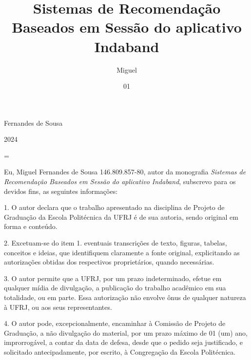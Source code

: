 \documentclass[tcc,numbers]{coppe}
\begin{document}
  \title{Sistemas de Recomendação Baseados em Sessão do aplicativo Indaband}
  \author{Miguel}{Fernandes de Sousa}

  \date{01}{2024}


  \hbadness=\maxdimen
  \maketitle

  \frontmatter

  \makecatalog


  \newpage
  \thispagestyle{fancy}
  \renewcommand{\headrulewidth}{0pt}


Eu, Miguel Fernandes de Sousa 146.809.857-80, autor da monografia
\textit{Sistemas de Recomendação Baseados em Sessão do aplicativo Indaband},
subscrevo para os devidos fins, as seguintes informações: 

1. O autor declara que o trabalho apresentado na disciplina de Projeto de
Graduação da Escola Politécnica da UFRJ é de sua autoria, sendo original em forma
e conteúdo.

2. Excetuam-se do item 1. eventuais transcrições de texto, figuras, tabelas,
conceitos e ideias, que identifiquem claramente a fonte original, explicitando
as autorizações obtidas dos respectivos proprietários, quando necessárias.

3. O autor permite que a UFRJ, por um prazo indeterminado, efetue em qualquer
mídia de divulgação, a publicação do trabalho acadêmico em sua totalidade, ou em
parte. Essa autorização não envolve ônus de qualquer natureza à UFRJ, ou aos seus
representantes.

4. O autor pode, excepcionalmente, encaminhar à Comissão de Projeto de Graduação,
a não divulgação do material, por um prazo máximo de 01 (um) ano, improrrogável,
a contar da data de defesa, desde que o pedido seja justificado, e solicitado
antecipadamente, por escrito, à Congregação da Escola Politécnica.
\end{document}
